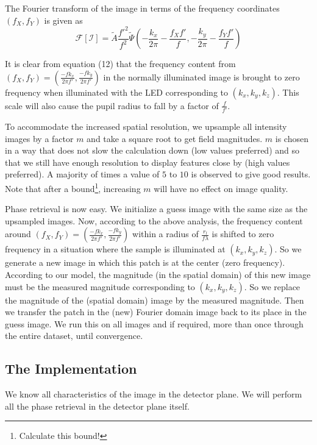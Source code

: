 \documentclass[11pt,a4paper,journal]{IEEEtran}
\begin{document}
The Fourier transform of the image in terms of the frequency coordinates $(f_X, f_Y)$ is given as 
\begin{equation}
\mathcal{F}[\mathcal{I}] = \tilde{A} \frac{f'^2}{f^2} \tilde{\Psi}\left(-\frac{k_x}{2\pi}-\frac{f_X f'}{f}, -\frac{k_y}{2\pi}-\frac{f_Y f'}{f}\right)
\end{equation}

It is clear from equation (12) that the frequency content from $(f_X, f_Y) = \left(\frac{-fk_x}{2\pi f'}, \frac{-fk_y}{2\pi f'}\right)$ in the normally illuminated image is brought to zero frequency when illuminated with the LED corresponding to $(k_x, k_y, k_z)$. This scale will also cause the pupil radius to fall by a factor of $\frac{f}{f'}$.

To accommodate the increased spatial resolution, we upsample all intensity images by a factor $m$ and take a square root to get field magnitudes. $m$ is chosen in a way that does not slow the calculation down (low values preferred) and so that we still have enough resolution to display features close by (high values preferred). A majority of times a value of $5$ to $10$ is observed to give good results. Note that after a bound\footnote{Calculate this bound!}, increasing $m$ will have no effect on image quality.

Phase retrieval is now easy. We initialize a guess image with the same size as the upsampled images. Now, according to the above analysis, the frequency content around $(f_X, f_Y) = \left(\frac{-fk_x}{2\pi f'}, \frac{-fk_y}{2\pi f'}\right)$ within a radius of $\frac{r_l}{f\lambda}$ is shifted to zero frequency in a situation where the sample is illuminated at $(k_x, k_y, k_z)$. So we generate a new image in which this patch is at the center (zero frequency). According to our model, the magnitude (in the spatial domain) of this new image must be the measured magnitude corresponding to $(k_x, k_y, k_z)$. So we replace the magnitude of the (spatial domain) image by the measured magnitude. Then we transfer the patch in the (new) Fourier domain image back to its place in the guess image. We run this on all images and if required, more than once through the entire dataset, until convergence.

\subsection{The Implementation}
We know all characteristics of the image in the detector plane. We will perform all the phase retrieval in the detector plane itself.
\end{document}

